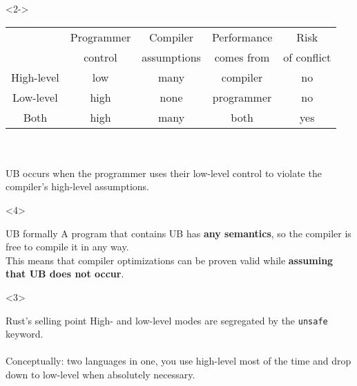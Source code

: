 \begin{frame}[fragile,t]
    \begin{onlyenv}<2->
        \begin{tabular}{|c|c|c|c|c|}
            \hline
                       & Programmer & Compiler    & Performance & Risk \\
                       & control    & assumptions & comes from  & of conflict \\
            \hline
            High-level & low        & many        & compiler    & no \\
            \hline
            Low-level  & high       & none        & programmer  & no \\
            \hline
            Both       & high       & many        & both        & yes \\
            \hline
        \end{tabular}~\\~\\

        UB occurs when the programmer uses their low-level control
        to violate the compiler's high-level assumptions.\\
    \end{onlyenv}

    \begin{onlyenv}<4>
        \begin{exampleblock}{UB formally}
            A program that contains UB has \textbf{any semantics},
            so the compiler is free to compile it in any way.\\
            This means that compiler optimizations can be proven valid
            while \textbf{assuming that UB does not occur}.
        \end{exampleblock}
    \end{onlyenv}

    \begin{onlyenv}<3>
        \begin{block}{Rust's selling point}
            High- and low-level modes are segregated by the \texttt{unsafe} keyword.\\~\\

            Conceptually: two languages in one, you use high-level most of the time
            and drop down to low-level when absolutely necessary.
        \end{block}
    \end{onlyenv}
\end{frame}

